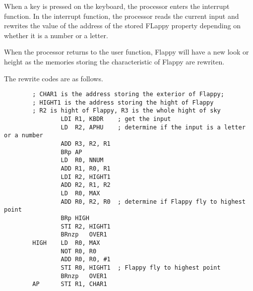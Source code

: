 \documentclass[20pt]{ctexart}
\begin{document}
When a key is pressed on the keyboard, the processor enters the interrupt function. In the interrupt function, the processor reads the current input and rewrites the value of the address of the stored FLappy property depending on whether it is a number or a letter.

When the processor returns to the user function, Flappy will have a new look or height as the memories storing the characteristic of Flappy are rewriten.

The rewrite codes are as follows.
\begin{verbatim}
        ; CHAR1 is the address storing the exterior of Flappy;
        ; HIGHT1 is the address storing the hight of Flappy
        ; R2 is hight of Flappy, R3 is the whole hight of sky
                LDI R1, KBDR    ; get the input 
                LD  R2, APHU    ; determine if the input is a letter or a number
                ADD R3, R2, R1
                BRp AP        
                LD  R0, NNUM
                ADD R1, R0, R1
                LDI R2, HIGHT1
                ADD R2, R1, R2
                LD  R0, MAX
                ADD R0, R2, R0  ; determine if Flappy fly to highest point
                BRp HIGH
                STI R2, HIGHT1
                BRnzp   OVER1
        HIGH    LD  R0, MAX
                NOT R0, R0
                ADD R0, R0, #1
                STI R0, HIGHT1  ; Flappy fly to highest point
                BRnzp   OVER1      
        AP      STI R1, CHAR1
\end{verbatim}
\end{document}
